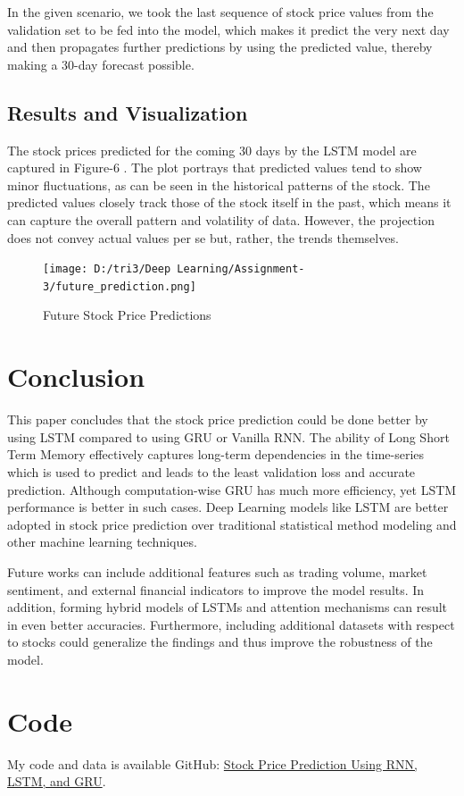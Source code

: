 \documentclass[10pt,twocolumn,a4paper]{article}
\begin{document}
In the given scenario, we took the last sequence of stock price values from the validation set to be fed into the model, which makes it predict the very next day and then propagates further predictions by using the predicted value, thereby making a 30-day forecast possible.

\subsection{Results and Visualization}
The stock prices predicted for the coming 30 days by the LSTM model are captured in Figure-6 . The plot portrays that predicted values tend to show minor fluctuations, as can be seen in the historical patterns of the stock. The predicted values closely track those of the stock itself in the past, which means it can capture the overall pattern and volatility of data. However, the projection does not convey actual values per se but, rather, the trends themselves.


\begin{figure}[htbp]
    \centering
    \texttt{[image: D:/tri3/Deep Learning/Assignment-3/future\_prediction.png]}
    \caption{Future Stock Price Predictions }
    \label{fig1: Implementation of AlexNet}
\end{figure}
\section{Conclusion}
This paper concludes that the stock price prediction could be done better by using LSTM compared to using GRU or Vanilla RNN. The ability of Long Short Term Memory effectively captures long-term dependencies in the time-series which is used to predict and leads to the least validation loss and accurate prediction. Although computation-wise GRU has much more efficiency, yet LSTM performance is better in such cases. Deep Learning models like LSTM are better adopted in stock price prediction over traditional statistical method modeling and other machine learning techniques.

Future works can include additional features such as trading volume, market sentiment, and external financial indicators to improve the model results. In addition, forming hybrid models of LSTMs and attention mechanisms can result in even better accuracies. Furthermore, including additional datasets with respect to stocks could generalize the findings and thus improve the robustness of the model.
\section{Code}
My code and data is available GitHub: \href{https://github.com/shivangi-crypto/Stock_price_prediction.git}{Stock Price Prediction Using RNN, LSTM, and GRU}.
\end{document}

